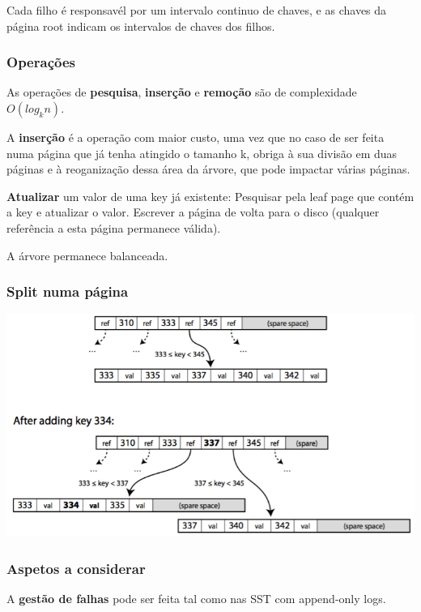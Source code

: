 \documentclass{article}
\begin{document}
Cada filho é responsavél por um intervalo continuo de chaves, e as chaves
da página root indicam os intervalos de chaves dos filhos.

\subsubsection{Operações}

As operações de \textbf{pesquisa}, \textbf{inserção} e \textbf{remoção} são de complexidade $O(log_k n)$.

A \textbf{inserção} é a operação com maior custo, uma vez que no caso de ser feita numa página que
já tenha atingido o tamanho k, obriga à sua divisão em duas páginas e à reoganização dessa
área da árvore, que pode impactar várias páginas.

\textbf{Atualizar} um valor de uma key já existente:
Pesquisar pela leaf page que contém a key e atualizar o valor. Escrever
a página de volta para o disco (qualquer referência a esta página permanece válida).

A árvore permanece balanceada.

\pagebreak

\subsubsection{Split numa página}

\begin{center}
  \includegraphics[scale=0.3]{47}
\end{center}

\subsubsection{Aspetos a considerar}

A \textbf{gestão de falhas} pode ser feita tal como nas SST com append-only logs.
\end{document}
